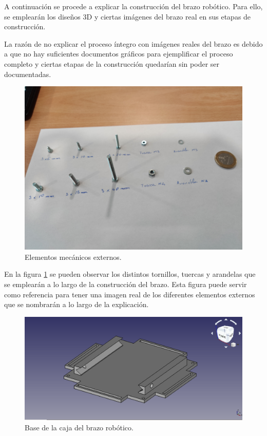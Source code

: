 A continuación se procede a explicar la construcción del brazo robótico. Para ello, se emplearán los diseños 3D y ciertas imágenes del brazo real en sus etapas de construcción.

La razón de no explicar el proceso íntegro con imágenes reales del brazo es debido a que no hay suficientes documentos gráficos para ejemplificar el proceso completo y ciertas etapas de la construcción quedarían sin poder ser documentadas.

\begin{figure}[H]
    \centering 
    \includegraphics[width=1\linewidth]{pictures/ElementosMecanicosExternos.jpg}
    \caption{Elementos mecánicos externos.}
    \label{fig:elementos_mecanicos_externos}
\end{figure}

En la figura \ref{fig:elementos_mecanicos_externos} se pueden observar los distintos tornillos, tuercas y arandelas que se emplearán a lo largo de la construcción del brazo. Esta figura puede servir como referencia para tener una imagen real de los diferentes elementos externos que se nombrarán a lo largo de la explicación.

\begin{figure}[H]
    \centering 
    \includegraphics[width=1\linewidth]{pictures/BaseDelBrazoRobotico.png}
    \caption{Base de la caja del brazo robótico.}
    \label{fig:base_caja_brazo_robotico}
\end{figure}

